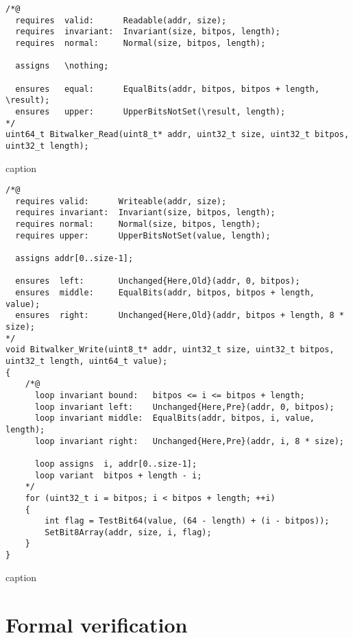 \begin{listing}[hbt]
\begin{minipage}{0.99\textwidth}
\begin{lstlisting}[style=acsl-block]
/*@
  requires  valid:      Readable(addr, size);
  requires  invariant:  Invariant(size, bitpos, length);
  requires  normal:     Normal(size, bitpos, length);

  assigns   \nothing;

  ensures   equal:      EqualBits(addr, bitpos, bitpos + length, \result);
  ensures   upper:      UpperBitsNotSet(\result, length);
*/
uint64_t Bitwalker_Read(uint8_t* addr, uint32_t size, uint32_t bitpos, uint32_t length);
\end{lstlisting}
\end{minipage}
\caption{caption}
\end{listing}



\begin{listing}[hbt]
\begin{minipage}{0.99\textwidth}
\begin{lstlisting}[style=acsl-block]
/*@
  requires valid:      Writeable(addr, size);
  requires invariant:  Invariant(size, bitpos, length);
  requires normal:     Normal(size, bitpos, length);
  requires upper:      UpperBitsNotSet(value, length);

  assigns addr[0..size-1];

  ensures  left:       Unchanged{Here,Old}(addr, 0, bitpos);
  ensures  middle:     EqualBits(addr, bitpos, bitpos + length, value);
  ensures  right:      Unchanged{Here,Old}(addr, bitpos + length, 8 * size);
*/
void Bitwalker_Write(uint8_t* addr, uint32_t size, uint32_t bitpos, uint32_t length, uint64_t value);
{
    /*@
      loop invariant bound:   bitpos <= i <= bitpos + length;
      loop invariant left:    Unchanged{Here,Pre}(addr, 0, bitpos);
      loop invariant middle:  EqualBits(addr, bitpos, i, value, length);
      loop invariant right:   Unchanged{Here,Pre}(addr, i, 8 * size);

      loop assigns  i, addr[0..size-1];
      loop variant  bitpos + length - i;
    */
    for (uint32_t i = bitpos; i < bitpos + length; ++i)
    {
        int flag = TestBit64(value, (64 - length) + (i - bitpos));
        SetBit8Array(addr, size, i, flag);
    }   
}

\end{lstlisting}
\end{minipage}
\caption{caption}
\end{listing}
















\FloatBarrier

\section{Formal verification}

